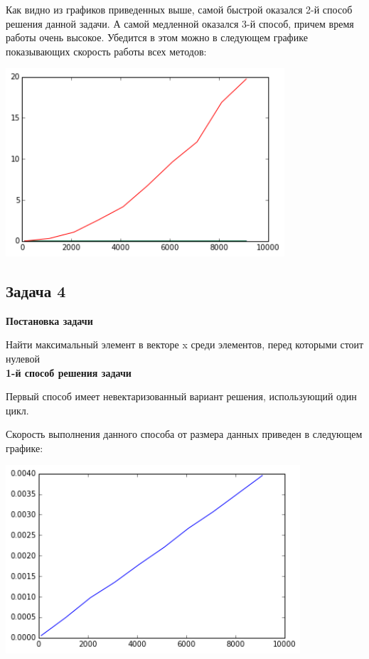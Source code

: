 \documentclass[12pt, a4paper]{article}
\begin{document}
				Как видно из графиков приведенных выше, самой быстрой оказался 2-й способ решения данной задачи. А самой медленной оказался 3-й способ, причем время работы очень высокое. Убедится в этом можно в следующем графике показывающих скорость работы всех методов:
				\begin{center}
					\includegraphics[height=7cm]{timeit/num3_ti123.png}
				\end{center}



		\newpage
		\subsection{Задача 4}

			{\bf Постановка задачи\\}

				Найти максимальный элемент в векторе x среди элементов, перед которыми стоит нулевой \\

			{\bf 1-й способ решения задачи\\}

				Первый способ имеет невектаризованный вариант решения, использующий один цикл.

				Скорость выполнения данного способа от размера данных приведен в следующем графике:
				\begin{center}
					\includegraphics[height=7cm]{timeit/num4_ti1.png}
				\end{center}
\end{document}
